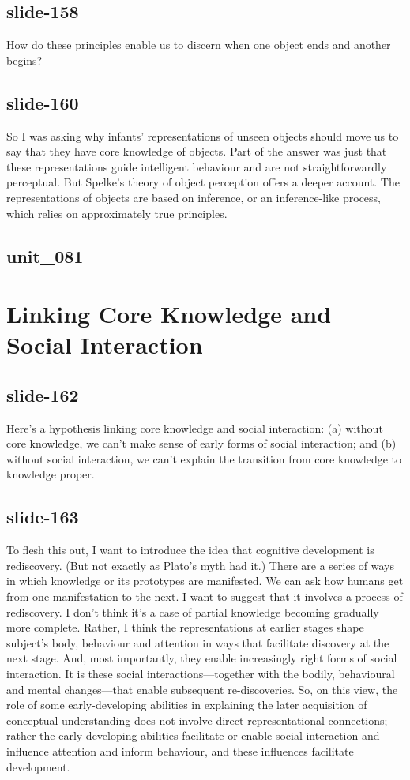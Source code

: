\documentclass[12pt,\papersize]{extarticle}
\begin{document}
 
\subsection{slide-158}
How do these principles enable us to discern when one object ends and another begins?
 
 
\subsection{slide-160}
So I was asking why infants' representations of unseen objects should move us to say that they have core knowledge of objects.
Part of the answer was just that these representations guide intelligent behaviour and are not straightforwardly perceptual.
But Spelke's theory of object perception offers a deeper account.
The representations of objects are based on inference, or an inference-like process, which relies on approximately true principles.
 
 
\subsection{unit\_081}
 
\section{Linking Core Knowledge and Social Interaction}
 
 
\subsection{slide-162}
Here's a hypothesis linking core knowledge and social interaction:
(a) without core knowledge, we can't make sense of early forms of social interaction;
and (b) without social interaction, we can't explain the transition from core knowledge to knowledge proper.
 
 
\subsection{slide-163}
To flesh this out, I want to introduce the idea that cognitive development is rediscovery.
(But not exactly as Plato's myth had it.)
There are a series of ways in which knowledge or its prototypes are manifested.
We can ask how humans get from one manifestation to the next.
I want to suggest that it involves a process of rediscovery.
I don't think it's a case of partial knowledge becoming gradually more complete.
Rather, I think the representations at earlier stages shape subject's body, behaviour and attention in ways that facilitate discovery at the next stage.
And, most importantly, they enable increasingly right forms of social interaction.
It is these social interactions---together with the bodily, behavioural and mental changes---that enable subsequent re-discoveries.
So, on this view, the role of some early-developing abilities in explaining the later acquisition of conceptual understanding does not involve direct representational connections; rather the early developing abilities facilitate or enable social interaction and influence attention and inform behaviour, and these influences facilitate development.
 
\end{document}
